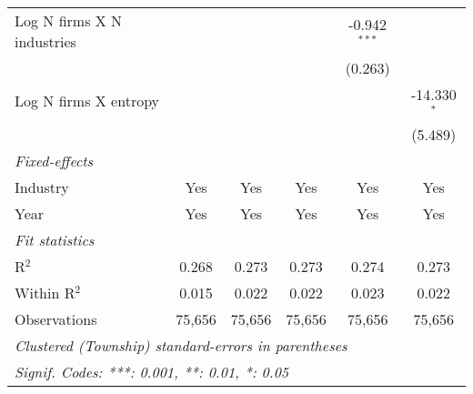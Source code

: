 \begin{tabular}{lccccc}
   Log N firms X N industries           &                 &                 &                 & -0.942$^{***}$  &   \\   
                                        &                 &                 &                 & (0.263)         &   \\   
   Log N firms X entropy                &                 &                 &                 &                 & -14.330$^{*}$\\   
                                        &                 &                 &                 &                 & (5.489)\\   
   \midrule
   \emph{Fixed-effects}\\
   Industry                             & Yes             & Yes             & Yes             & Yes             & Yes\\  
   Year                                 & Yes             & Yes             & Yes             & Yes             & Yes\\  
   \midrule
   \emph{Fit statistics}\\
   R$^2$                                & 0.268           & 0.273           & 0.273           & 0.274           & 0.273\\  
   Within R$^2$                         & 0.015           & 0.022           & 0.022           & 0.023           & 0.022\\  
   Observations                         & 75,656          & 75,656          & 75,656          & 75,656          & 75,656\\  
   \midrule \midrule
   \multicolumn{6}{l}{\emph{Clustered (Township) standard-errors in parentheses}}\\
   \multicolumn{6}{l}{\emph{Signif. Codes: ***: 0.001, **: 0.01, *: 0.05}}\\
\end{tabular}
\par\endgroup
